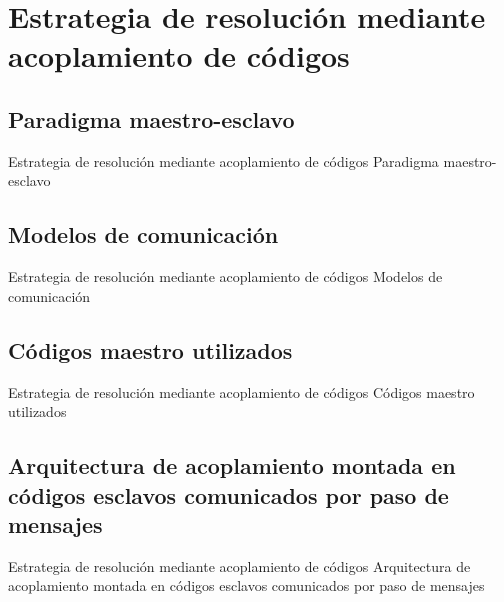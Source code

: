\section{Estrategia de resolución mediante acoplamiento de códigos}

\subsection{Paradigma maestro-esclavo}

\begin{frame}
{Estrategia de resolución mediante acoplamiento de códigos}
{Paradigma maestro-esclavo}

\end{frame}


\subsection{Modelos de comunicación}

\begin{frame}
{Estrategia de resolución mediante acoplamiento de códigos}
{Modelos de comunicación}

\end{frame}


\subsection{Códigos maestro utilizados}

\begin{frame}
{Estrategia de resolución mediante acoplamiento de códigos}
{Códigos maestro utilizados}

\end{frame}

\subsection{Arquitectura de acoplamiento montada en códigos esclavos comunicados por paso de mensajes}

\begin{frame}
{Estrategia de resolución mediante acoplamiento de códigos}
{Arquitectura de acoplamiento montada en códigos esclavos comunicados por paso de mensajes}

\end{frame}